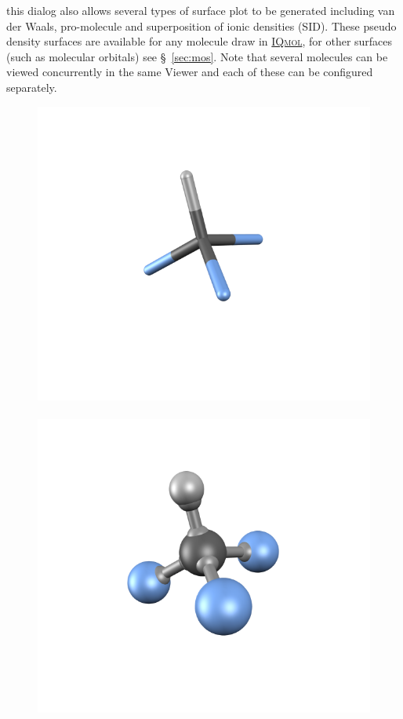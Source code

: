 \documentclass[a4paper,12pt]{article}
\newcommand{\iqmol}{\href{http://iqmol.org}{{\scshape IQmol}}}
\begin{document}
this dialog also allows several types of surface plot to be generated including
van der Waals, pro-molecule and superposition of ionic densities (SID).  These
pseudo density surfaces are available for any molecule draw in \iqmol{}, for
other surfaces (such as molecular orbitals) see \S\ \ref{sec:mos}.
Note that several molecules can be viewed concurrently in the same Viewer
and each of these can be configured separately.  
\begin{figure}[h]
\begin{center}
\includegraphics[scale=0.20]{figures/CHF3-tubes.png}\hspace{-15mm}~
\includegraphics[scale=0.20]{figures/CHF3-moly.png}\hspace{-15mm}~

\end{center}
\end{figure}
\end{document}
